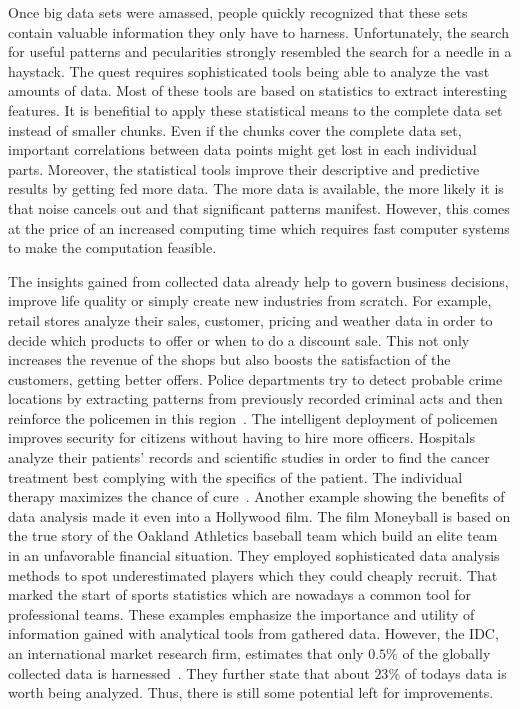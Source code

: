 Once big data sets were amassed, people quickly recognized that these sets contain valuable information they only have to harness.
Unfortunately, the search for useful patterns and pecularities strongly resembled the search for a needle in a haystack.
The quest requires sophisticated tools being able to analyze the vast amounts of data.
Most of these tools are based on statistics to extract interesting features.
It is benefitial to apply these statistical means to the complete data set instead of smaller chunks.
Even if the chunks cover the complete data set, important correlations between data points might get lost in each individual parts.
Moreover, the statistical tools improve their descriptive and predictive results by getting fed more data.
The more data is available, the more likely it is that noise cancels out and that significant patterns manifest.
However, this comes at the price of an increased computing time which requires fast computer systems to make the computation feasible.

The insights gained from collected data already help to govern business decisions, improve life quality or simply create new industries from scratch.
For example, retail stores analyze their sales, customer, pricing and weather data in order to decide which products to offer or when to do a discount sale.
This not only increases the revenue of the shops but also boosts the satisfaction of the customers, getting better offers. 
Police departments try to detect probable crime locations by extracting patterns from previously recorded criminal acts and then reinforce the policemen in  this region~\cite{lohr:yt2012a}.
The intelligent deployment of policemen improves security for citizens without having to hire more officers.
Hospitals analyze their patients' records and scientific studies in order to find the cancer treatment best complying with the specifics of the patient.
The individual therapy maximizes the chance of cure~\cite{watson:2013a}.
Another example showing the benefits of data analysis made it even into a Hollywood film.
The film Moneyball is based on the true story of the Oakland Athletics baseball team which build an elite team in an unfavorable financial situation.
They employed sophisticated data analysis methods to spot underestimated players which they could cheaply recruit.
That marked the start of sports statistics which are nowadays a common tool for professional teams.
These examples emphasize the importance and utility of information gained with analytical tools from gathered data.
However, the IDC, an international market research firm, estimates that only $0.5\%$ of the globally collected data is harnessed~\cite{gantz:iaf2012a}.
They further state that about $23\%$ of todays data is worth being analyzed.
Thus, there is still some potential left for improvements.

